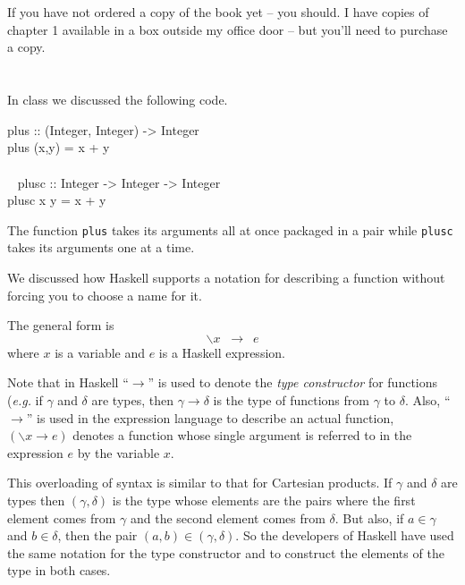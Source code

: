 \documentclass[11pt]{article}
\begin{document}

\section{}


If you have not ordered a copy of the book yet -- you
should.  I have copies of chapter 1 available in a box outside my office door
-- but you'll need to purchase a copy.


\section{}
In class we discussed the following code.

\begin{program*}

\> plus :: (Integer, Integer) -> Integer \\
\> plus (x,y) = x + y \\
\>   \\\
\> plusc :: Integer -> Integer -> Integer \\
\> plusc x y = x + y \\
\end{program*}


The function {\tt{plus}} takes its arguments all at once packaged in a pair
while {\tt{plusc}} takes its arguments one at a time.

We discussed how Haskell supports a notation for describing a function without
forcing you to choose a name for it.

The general form is 
\[ \backslash x \;\;\rightarrow\:\; e \]
where $x$ is a variable and $e$ is a Haskell expression.

Note that in Haskell ``$\rightarrow$'' is used to denote the {\em{type
constructor}} for functions ({\em{e.g.}} if $\gamma$ and $\delta$ are types,
then $\gamma \rightarrow \delta$ is the type of functions from $\gamma$ to
$\delta$.  Also, ``$\rightarrow$'' is used in the expression language to
describe an actual function, $(\backslash x \rightarrow e)$ denotes a function
whose single argument is referred to in the expression $e$ by the variable $x$.

This overloading of syntax is similar to that for Cartesian products.  If
$\gamma$ and $\delta$ are types then $(\gamma,\delta)$ is the type whose
elements are the pairs where the first element comes from $\gamma$ and the
second element comes from $\delta$. But also, if $a\in\gamma$ and $b\in\delta$,
then the pair $(a,b)\in(\gamma,\delta)$.  So the developers of Haskell have
used the same notation for the type constructor and to construct the elements
of the type in both cases.
\end{document}
